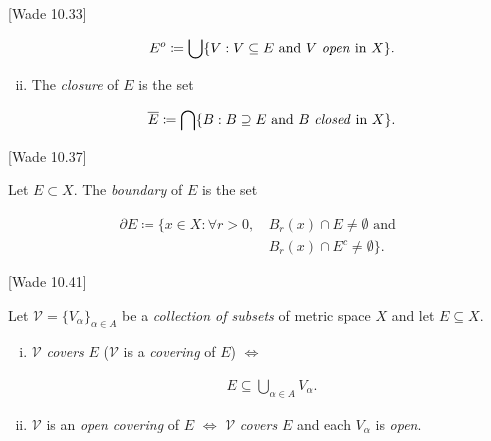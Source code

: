 \documentclass[10pt]{article} %
\newcommand{\cw}[1]{[Wade #1]}
\begin{document}
\begin{multicols}{3}
\begin{definition}{\cw{10.33}}{}
\begin{enumerate}[i)]
                \begin{align*}
                    E^o \coloneqq \bigcup \{V : V \subseteq E \,\,\textrm{and $V$ \emph{open} in $X$}\}.
                \end{align*}

            \item The \emph{closure} of $E$ is the set

                \begin{align*}
                    \overline{E} \coloneqq \bigcap \{B : B \supseteq E \,\,\textrm{and $B$ \emph{closed} in $X$}\}.
                \end{align*}
        \end{enumerate}

\end{definition}

\begin{definition}{\cw{10.37}}{}

    Let $E \subset X$. The \emph{boundary} of $E$ is the set

        \begin{align*}
            \partial E \coloneqq \{x \in X : \forall r > 0,\, &B_r(x) \cap E \neq \emptyset \textrm{ and } \\ &B_r(x) \cap E^c \neq \emptyset\}.
        \end{align*}

\end{definition}

\begin{definition}{\cw{10.41}}{}

    Let $\mathcal{V} = \{V_{\alpha}\}_{\alpha \in A}$ be a \emph{collection of subsets} of metric space $X$ and let $E \subseteq X$.

        \begin{enumerate}[i)]
            \setlength{\parskip}{0em}
            \item $\mathcal{V}$ \emph{covers} $E$ ($\mathcal{V}$ is a \emph{covering} of $E$) $\Leftrightarrow$

                \begin{align*}
                    E \subseteq \bigcup_{\alpha \in A} V_{\alpha}.
                \end{align*}

            \item $\mathcal{V}$ is an \emph{open covering} of $E$ $\Leftrightarrow$ $\mathcal{V}$ \emph{covers} $E$ and each $V_{\alpha}$ is \emph{open}.


\end{enumerate}
\end{definition}
\end{multicols}
\end{document}
